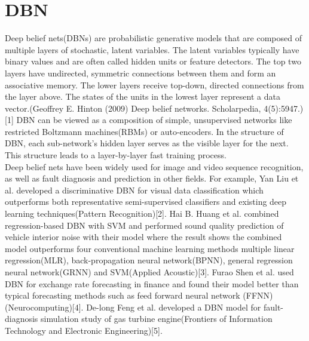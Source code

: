 \documentclass{kththesis}
\begin{document}
\section{DBN}
Deep belief nets(DBNs) are probabilistic generative models that are composed of multiple layers of stochastic, latent variables. The latent variables typically have binary values and are often called hidden units or feature detectors. The top two layers have undirected, symmetric connections between them and form an associative memory. The lower layers receive top-down, directed connections from the layer above. The states of the units in the lowest layer represent a data vector.(Geoffrey E. Hinton (2009) Deep belief networks. Scholarpedia, 4(5):5947.)[1] DBN can be viewed as a composition of simple, unsupervised networks like restricted Boltzmann machines(RBMs) or auto-encoders. In the structure of DBN, each sub-network's hidden layer serves as the visible layer for the next. This structure leads to a layer-by-layer fast training process.\\
Deep belief nets have been widely used for image and video sequence recognition, as well as fault diagnosis and prediction in other fields. For example, Yan Liu et al. developed a discriminative DBN for visual data classification which outperforms both representative semi-supervised classifiers and existing deep learning techniques(Pattern Recognition)[2]. Hai B. Huang et al. combined regression-based DBN with SVM and performed sound quality prediction of vehicle interior noise with their model where the result shows the combined model outperforms four conventional machine learning methods multiple linear regression(MLR), back-propagation neural network(BPNN), general regression neural network(GRNN) and SVM(Applied Acoustic)[3]. Furao Shen et al. used DBN for exchange rate forecasting in finance and found their model better than typical forecasting methods such as feed forward neural network (FFNN)(Neurocomputing)[4]. De-long Feng et al. developed a DBN model for  fault-diagnosis simulation study of gas turbine engine(Frontiers of Information Technology and Electronic Engineering)[5].
\\
\end{document}
